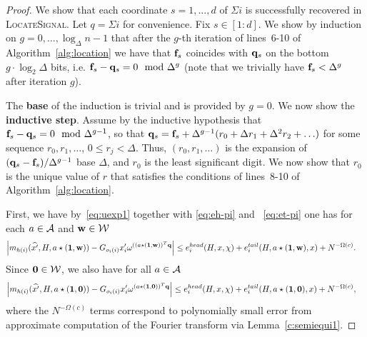 \begin{proof}
We show that each coordinate $s=1,\ldots, d$ of $\Sigma i$ is successfully recovered in \textsc{LocateSignal}. Let $q=\Sigma i$ for convenience.
Fix $s\in [1:d]$. We show by induction on $g=0,\ldots, \log_{\Delta} n-1$ that after the $g$-th iteration of lines~6-10 of Algorithm~\ref{alg:location} we have that ${\bf f}_s$ coincides with ${\bf q}_s$ on the bottom $g\cdot \log_2 \Delta$ bits, i.e. ${\bf f}_s-{\bf q}_s= 0 \mod \Delta^g$ (note that we trivially have ${\bf f}_s< \Delta^g$ after iteration $g$).

The {\bf base} of the induction is trivial and is provided by $g=0$.  
We now show the {\bf inductive step}. Assume by the inductive hypothesis that ${\bf f}_s-{\bf q}_s= 0 \mod \Delta^{g-1}$, so that
${\bf q}_s={\bf f}_s+\Delta^{g-1}(r_0+\Delta r_1+\Delta^2 r_2+\ldots)$ for some sequence $r_0,r_1,\ldots$, $0\leq r_j<\Delta$. Thus,  $(r_0, r_1,\ldots)$ is the expansion of $({\bf q}_s-{\bf f}_s)/\Delta^{g-1}$ base $\Delta$, and $r_0$ is the least significant digit. We now show that $r_0$ is the unique value of $r$ that satisfies the conditions of lines~8-10 of Algorithm~\ref{alg:location}. 

First, we have by~\eqref{eq:uexp1} together with \eqref{eq:eh-pi} and ~\eqref{eq:et-pi} one has for each $a\in {\mathcal{A}}$ and $\mathbf{w}\in \mathcal{W}$
\begin{equation*}
\begin{split}
\left|m_{h(i)}(\widehat{x'}, H, a\star (\mathbf{1}, \mathbf{w}))- G_{o_i(i)} x'_i \omega^{((a\star(\mathbf{1}, \mathbf{w}))^T {\bf q}}\right|&\leq  e^{head}_i(H, x, \chi)+e^{tail}_i(H, a\star(\mathbf{1}, \mathbf{w}), x)+N^{-\Omega(c)}.
\end{split}
\end{equation*}
Since $\mathbf{0}\in \mathcal{W}$, we also have for all $a\in {\mathcal{A}}$
\begin{equation*}
\begin{split}
\left|m_{h(i)}(\widehat{x'}, H, a\star (\mathbf{1}, \mathbf{0}))- G_{o_i(i)} x'_i \omega^{(a\star(\mathbf{1}, \mathbf{0}))^T {\bf q}}\right|&\leq  e^{head}_i(H, x, \chi)+e^{tail}_i(H, a\star (\mathbf{1}, \mathbf{0}), x)+N^{-\Omega(c)},
\end{split}
\end{equation*}
where the $N^{-\Omega(c)}$ terms correspond to polynomially small error from approximate computation of the Fourier transform via Lemma~\ref{c:semiequi1}.



\end{proof}

